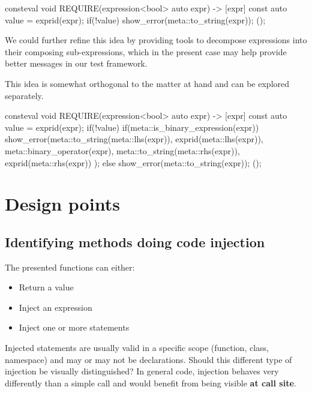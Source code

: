 \documentclass{wg21}
\begin{document}
\begin{codeblock}
consteval void REQUIRE(expression<bool> auto expr) {
    -> [expr] {
        const auto value = exprid(expr);
        if(!value) {
            show_error(meta::to_string(expr));
        }
    }(); 
}
\end{codeblock}

We could further refine this idea by providing tools to decompose expressions into
their composing sub-expressions, which in the present case may help provide better
messages in our test framework.

This idea is somewhat orthogonal to the matter at hand and can be explored separately.


\begin{codeblock}
consteval void REQUIRE(expression<bool> auto expr) {
    -> [expr] {
        const auto value = exprid(expr);
        if(!value) {
            if(meta::is_binary_expression(expr)) {
                show_error(meta::to_string(meta::lhs(expr)),
                           exprid(meta::lhs(expr)),
                           meta::binary_operator(expr),
                           meta::to_string(meta::rhs(expr)),
                           exprid(meta::rhs(expr))               
                );
            }
        }
        else {
            show_error(meta::to_string(expr));
        }
    }(); 
}
\end{codeblock}

\section{Design points}

\subsection{Identifying methods doing code injection}

The presented  functions can either: 
\begin{itemize}
    \item Return a value
    \item Inject an expression
    \item Inject one or more statements
\end{itemize}

Injected statements are usually valid in a specific scope (function, class, namespace) and may or may not be declarations.
Should this different type of injection be visually distinguished?
In general code, injection behaves very differently than a simple call and would benefit from being visible \textbf{at call site}.
\end{document}
